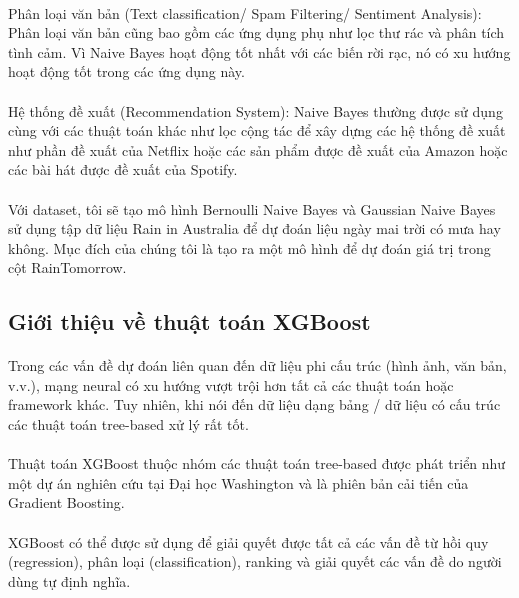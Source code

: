 \documentclass{article}
\begin{document}
\paragraph{}Phân loại văn bản (Text classification/ Spam Filtering/ Sentiment Analysis): Phân loại văn bản cũng bao gồm các ứng dụng phụ như lọc thư rác và phân tích tình cảm. Vì Naive Bayes hoạt động tốt nhất với các biến rời rạc, nó có xu hướng hoạt động tốt trong các ứng dụng này.
\paragraph{}Hệ thống đề xuất (Recommendation System): Naive Bayes thường được sử dụng cùng với các thuật toán khác như lọc cộng tác để xây dựng các hệ thống đề xuất như phần đề xuất của Netflix hoặc các sản phẩm được đề xuất của Amazon hoặc các bài hát được đề xuất của Spotify.
\paragraph{}Với dataset, tôi sẽ tạo mô hình Bernoulli Naive Bayes và Gaussian Naive Bayes sử dụng tập dữ liệu Rain in Australia để dự đoán liệu ngày mai trời có mưa hay không. Mục đích của chúng tôi là tạo ra một mô hình để dự đoán giá trị trong cột RainTomorrow.
\pagebreak
\subsection{Giới thiệu về thuật toán XGBoost}
\paragraph{}Trong các vấn đề dự đoán liên quan đến dữ liệu phi cấu trúc (hình ảnh, văn bản, v.v.), mạng neural có xu hướng vượt trội hơn tất cả các thuật toán hoặc framework khác. Tuy nhiên, khi nói đến dữ liệu dạng bảng / dữ liệu có cấu trúc các thuật toán tree-based xử lý rất tốt. 
\paragraph{}
Thuật toán XGBoost thuộc nhóm các thuật toán tree-based được phát triển như một dự án nghiên cứu tại Đại học Washington và là phiên bản cải tiến của Gradient Boosting.
\paragraph{}XGBoost có thể được sử dụng để giải quyết được tất cả các vấn đề từ hồi quy (regression), phân loại (classification), ranking và giải quyết các vấn đề do người dùng tự định nghĩa.
\end{document}
